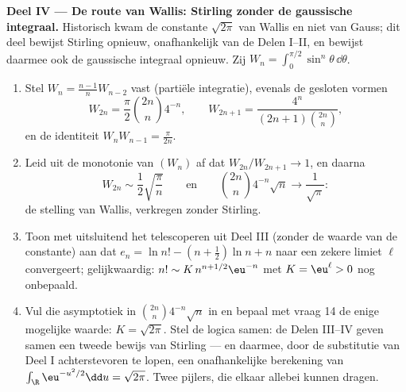 \begin{problem}
\medskip
\noindent\textbf{Deel IV --- De route van Wallis: Stirling zonder
de gaussische integraal.} Historisch kwam de constante
$\sqrt{2\pi}$ van Wallis en niet van Gauss; dit deel bewijst
Stirling opnieuw, onafhankelijk van de Delen I--II, en bewijst
daarmee ook de gaussische integraal opnieuw. Zij $W_n =
\int_0^{\pi/2}\sin^n\theta\, \dd\theta$.
\begin{enumerate}[resume]
  \item Stel $W_n = \frac{n-1}nW_{n-2}$ vast (partiële
        integratie), evenals de gesloten vormen
        \[
        W_{2n} = \frac\pi2\binom{2n}n4^{-n}, \qquad
        W_{2n+1} = \frac{4^n}{(2n+1)\binom{2n}n},
        \]
        en de identiteit $W_nW_{n-1} = \frac\pi{2n}$.
  \item Leid uit de monotonie van $(W_n)$ af dat
        $W_{2n}/W_{2n+1} \to 1$, en daarna
        \[
        W_{2n} \sim \frac12\sqrt{\frac\pi n}
        \qquad\text{en}\qquad
        \binom{2n}n4^{-n}\sqrt n \longrightarrow
        \frac1{\sqrt\pi} :
        \]
        de stelling van Wallis, verkregen zonder Stirling.
  \item Toon met uitsluitend het telescoperen uit Deel III (zonder
        de waarde van de constante) aan dat $e_n = \ln n! - (n +
        \frac12)\ln n + n$ naar een zekere limiet $\ell$
        convergeert; gelijkwaardig: $n! \sim K\,n^{n+1/2}\eu^{-n}$
        met $K = \eu^\ell > 0$ nog onbepaald.
  \item Vul die asymptotiek in $\binom{2n}n4^{-n}\sqrt n$ in en
        bepaal met vraag 14 de enige mogelijke waarde: $K =
        \sqrt{2\pi}$. Stel de logica samen: de Delen III--IV geven
        samen een  tweede bewijs van Stirling --- en
        daarmee, door de substitutie van Deel I achterstevoren te
        lopen, een onafhankelijke berekening van
        $\int_\R\eu^{-u^2/2}\dd u = \sqrt{2\pi}$. Twee pijlers,
        die elkaar allebei kunnen dragen.
\end{enumerate}


\end{problem}

